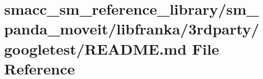 \hypertarget{smacc__sm__reference__library_2sm__panda__moveit_2libfranka_23rdparty_2googletest_2README_8md}{}\section{smacc\+\_\+sm\+\_\+reference\+\_\+library/sm\+\_\+panda\+\_\+moveit/libfranka/3rdparty/googletest/\+R\+E\+A\+D\+ME.md File Reference}
\label{smacc__sm__reference__library_2sm__panda__moveit_2libfranka_23rdparty_2googletest_2README_8md}
